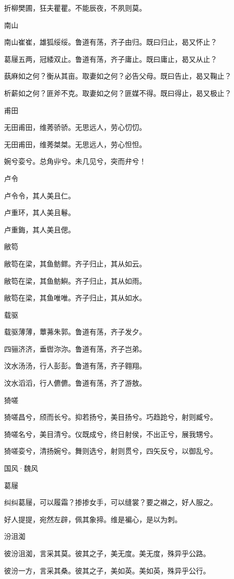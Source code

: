折柳樊圃，狂夫瞿瞿。不能辰夜，不夙则莫。

南山

南山崔崔，雄狐绥绥。鲁道有荡，齐子由归。既曰归止，曷又怀止？

葛屦五两，冠緌双止。鲁道有荡，齐子庸止。既曰庸止，曷又从止？

蓺麻如之何？衡从其亩。取妻如之何？必告父母。既曰告止，曷又鞠止？

析薪如之何？匪斧不克。取妻如之何？匪媒不得。既曰得止，曷又极止？

甫田

无田甫田，维莠骄骄。无思远人，劳心忉忉。

无田甫田，维莠桀桀。无思远人，劳心怛怛。

婉兮娈兮。总角丱兮。未几见兮，突而弁兮！

卢令

卢令令，其人美且仁。

卢重环，其人美且鬈。

卢重鋂，其人美且偲。

敝笱

敝笱在梁，其鱼鲂鳏。齐子归止，其从如云。

敝笱在梁，其鱼鲂鱮。齐子归止，其从如雨。

敝笱在梁，其鱼唯唯。齐子归止，其从如水。

载驱

载驱薄薄，蕈茀朱郭。鲁道有荡，齐子发夕。

四骊济济，垂辔沵沵。鲁道有荡，齐子岂弟。

汶水汤汤，行人彭彭。鲁道有荡，齐子翱翔。

汶水滔滔，行人儦儦。鲁道有荡，齐了游敖。

猗嗟

猗嗟昌兮，颀而长兮。抑若扬兮，美目扬兮。巧趋跄兮，射则臧兮。

猗嗟名兮，美目清兮。仪既成兮，终日射侯，不出正兮，展我甥兮。

猗嗟娈兮，清扬婉兮。舞则选兮，射则贯兮，四矢反兮，以御乱兮。




国风·魏风


葛屦

纠纠葛屦，可以履霜？掺掺女手，可以缝裳？要之襋之，好人服之。

好人提提，宛然左辟，佩其象揥。维是褊心，是以为刺。

汾沮洳

彼汾沮洳，言采其莫。彼其之子，美无度。美无度，殊异乎公路。

彼汾一方，言采其桑。彼其之子，美如英。美如英，殊异乎公行。

